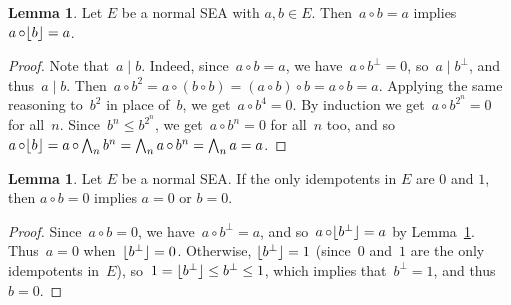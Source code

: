 \documentclass[a4paper, onecolumn, accepted=2020-12-22]{quantumarticle}
\DeclarePairedDelimiter{\floor}{\lfloor}{\rfloor}
\newcommand{\mult}{\mathop{\circ}}
\newcommand{\commu}{\mathrel{\lvert}}
\newcounter{counter}
\theoremstyle{definition}
\newtheorem{lemma}[counter]{Lemma}
\begin{document}
\begin{lemma}
  \label{lem:multfloor}
  Let $E$ be a normal SEA with $a,b\in E$.
  Then~$a\mult b=a$ implies $a\mult \floor{b}=a$.
\end{lemma}
\begin{proof}
Note that~$a\commu b$.
Indeed, since~$a\mult b=a$, we have~$a\mult b^\perp = 0$,
  so~$a\commu b^\perp$, and thus~$a \commu b$.
  Then~$a\mult b^2 = a\mult (b\mult b)=(a\mult b)\mult b = a\mult b= a$.
Applying the same reasoning to~$b^2$ in place of~$b$, we
get~$a\mult b^4=0$.
By induction we get~$a\mult b^{2^n}=0$ for all~$n$.
Since~$b^n\leq b^{2^n}$,
we get~$a\mult b^n=0$ for all~$n$ too,
and so~$a\mult\floor{b}=a\mult\bigwedge_n b^n
  =\bigwedge_n a\mult b^n=\bigwedge_n a =a$.
\end{proof}

\begin{lemma}
    Let $E$ be a normal SEA. If the only idempotents in $E$ are $0$ and $1$, then $a\mult b = 0$ implies $a=0$ or $b=0$.
\end{lemma}
\begin{proof}
Since~$a\mult b=0$,
we have~$a \mult b^\perp = a$,
  and so~$a\mult\floor{b^\perp} = a$ by Lemma~\ref{lem:multfloor}.
Thus~$a=0$ when~$\floor{b^\perp}=0$.
  Otherwise, $\floor{b^\perp}=1$
  (since~$0$ and~$1$ are the only idempotents in~$E$),
  so~$1=\floor{b^\perp}\leq b^\perp \leq 1$,
  which implies that~$b^\perp=1$,
  and thus~$b=0$.
\end{proof}
\end{document}
